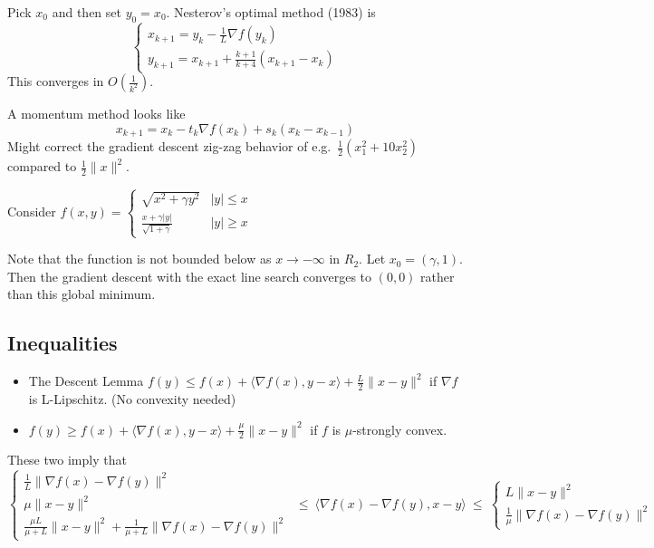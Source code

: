 \documentclass[english, 11pt]{article}
\begin{document}
\begin{thrm}
Pick $x_0$ and then set $y_0 = x_0$. Nesterov's optimal method (1983) is 
\[
\begin{cases} x_{k+1} = y_k - \frac{1}{L} \nabla f(y_k)  \\
y_{k+1} = x_{k+1} + \frac{k+1}{k+4} (x_{k+1} - x_k)
\end{cases}
\]
This converges in $O(\frac{1}{k^2})$.

\end{thrm}


\begin{rem}
A momentum method looks like
\[
x_{k+1} = x_k - t_k \nabla f(x_k) + s_k (x_k - x_{k-1})
\]
Might correct the gradient descent zig-zag behavior of e.g.\ $\frac{1}{2}(x_1^2 + 10x_2^2)$ compared to $\frac{1}{2} \|x\|^2$.
\end{rem}

\begin{exmp}
Consider $f(x,y) = \begin{cases}
\sqrt{x^2 + \gamma y^2} & |y| \le x \\
\frac{ x + \gamma |y|}{\sqrt{1+\gamma}} & |y| \ge x
\end{cases}$

Note that the function is not bounded below as $x \to -\infty$ in $R_2$. Let $x_0 = (\gamma,1)$. Then the gradient descent with the exact line search converges to $(0,0)$ rather than this global minimum.
\end{exmp}

\subsection{Inequalities}
\begin{itemize}
\item The Descent Lemma $f(y) \le f(x) + \langle \nabla f(x), y-x \rangle + \frac{L}{2} \|x-y\|^2$ if $\nabla f$ is L-Lipschitz. (No convexity needed)
\item $f(y) \ge f(x) + \langle \nabla f(x), y-x \rangle + \frac{\mu}{2} \|x-y\|^2$ if $f$ is $\mu$-strongly convex.
\end{itemize}
These two imply that
\[
\begin{cases}
\frac{1}{L} \| \nabla f(x) - \nabla f(y) \|^2 \\
\mu \|x-y\|^2 \\
\frac{\mu L}{\mu+L} \|x-y\|^2 + \frac{1}{\mu+L} \| \nabla f(x) - \nabla f(y) \|^2
\end{cases} 
\ \le \ \langle \nabla f(x) - \nabla f(y), x-y \rangle
\ \le  \ \begin{cases} 
L \|x-y\|^2 \\
\frac{1}{\mu} \| \nabla f(x) - \nabla f(y) \|^2
\end{cases}
\]
\end{document}
